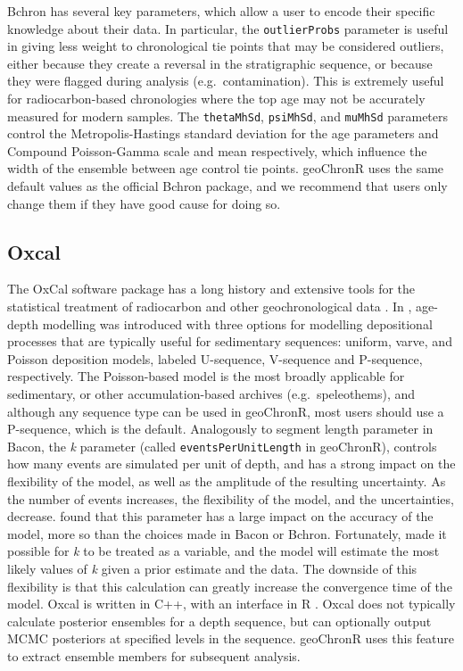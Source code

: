 \documentclass[gchron, manuscript]{copernicus}
\begin{document}
Bchron has several key parameters, which allow a user to encode their specific knowledge about their data.
In particular, the \texttt{outlierProbs} parameter is useful in giving less weight to chronological tie points that may be considered outliers, either because they create a reversal in the stratigraphic sequence, or because they were flagged during analysis (e.g.~contamination).
This is extremely useful for radiocarbon-based chronologies where the top age may not be accurately measured for modern samples.
The \texttt{thetaMhSd}, \texttt{psiMhSd}, and \texttt{muMhSd} parameters control the Metropolis-Hastings standard deviation for the age parameters and Compound Poisson-Gamma scale and mean respectively, which influence the width of the ensemble between age control tie points.
geoChronR uses the same default values as the official Bchron package, and we recommend that users only change them if they have good cause for doing so.

\subsection{Oxcal}

The OxCal software package has a long history and extensive tools for the statistical treatment of radiocarbon and other geochronological data \citep{BronkRamsey95}.
In \citet{ramsey2008deposition}, age-depth modelling was introduced with three options for modelling depositional processes that are typically useful for sedimentary sequences: uniform, varve, and Poisson deposition models, labeled U-sequence, V-sequence and P-sequence, respectively.
The Poisson-based model is the most broadly applicable for sedimentary, or other accumulation-based archives (e.g.~speleothems), and although any sequence type can be used in geoChronR, most users should use a P-sequence, which is the default.
Analogously to segment length parameter in Bacon, the \emph{k} parameter (called \texttt{eventsPerUnitLength} in geoChronR), controls how many events are simulated per unit of depth, and has a strong impact on the flexibility of the model, as well as the amplitude of the resulting uncertainty.
As the number of events increases, the flexibility of the model, and the uncertainties, decrease.
\citet{trachsel2017} found that this parameter has a large impact on the accuracy of the model, more so than the choices made in Bacon or Bchron.
Fortunately, \citet{bronkramsey2010} made it possible for \emph{k} to be treated as a variable, and the model will estimate the most likely values of \emph{k} given a prior estimate and the data. The downside of this flexibility is that this calculation can greatly increase the convergence time of the model.
Oxcal is written in C++, with an interface in R \citep{oxcAAR}.
Oxcal does not typically calculate posterior ensembles for a depth sequence, but can optionally output MCMC posteriors at specified levels in the sequence.
geoChronR uses this feature to extract ensemble members for subsequent analysis.
\end{document}
